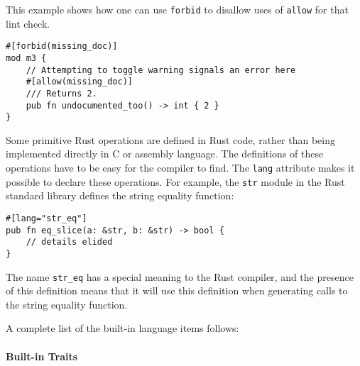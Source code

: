 \documentclass[]{article}
\begin{document}
This example shows how one can use \texttt{forbid} to disallow uses of
\texttt{allow} for that lint check.

\begin{verbatim}
#[forbid(missing_doc)]
mod m3 {
    // Attempting to toggle warning signals an error here
    #[allow(missing_doc)]
    /// Returns 2.
    pub fn undocumented_too() -> int { 2 }
}
\end{verbatim}


Some primitive Rust operations are defined in Rust code, rather than
being implemented directly in C or assembly language. The definitions of
these operations have to be easy for the compiler to find. The
\texttt{lang} attribute makes it possible to declare these operations.
For example, the \texttt{str} module in the Rust standard library
defines the string equality function:

\begin{verbatim}
#[lang="str_eq"]
pub fn eq_slice(a: &str, b: &str) -> bool {
    // details elided
}
\end{verbatim}

The name \texttt{str\_eq} has a special meaning to the Rust compiler,
and the presence of this definition means that it will use this
definition when generating calls to the string equality function.

A complete list of the built-in language items follows:

\paragraph{Built-in Traits}\label{built-in-traits}
\end{document}
